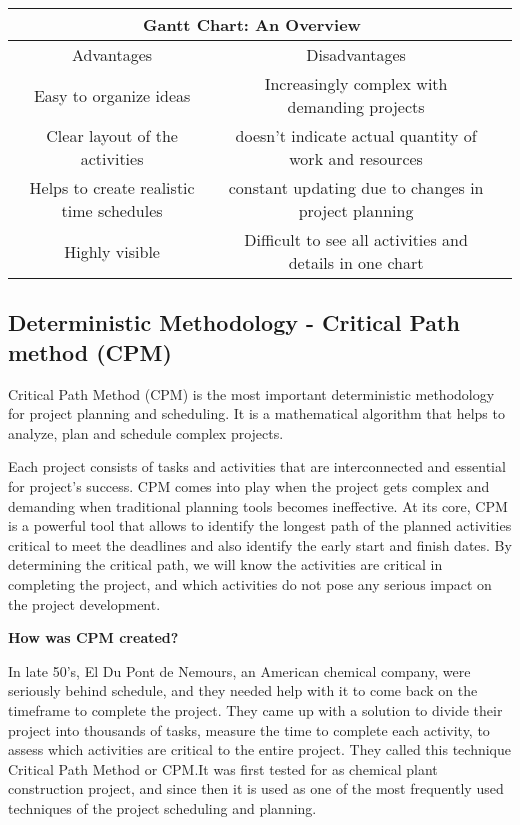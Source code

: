 \begin{tabular}{ |c|c|c| } 
	\hline
	\multicolumn{2}{|c|}{ Gantt Chart: An Overview} \\
	\hline
	Advantages & Disadvantages \\
	\hline
	Easy to organize ideas & Increasingly complex with demanding projects\\
	\hline
	Clear layout of the activities &  doesn't indicate actual quantity of work and resources \\
	\hline
	Helps to create realistic time schedules &constant updating due to changes in project planning \\
	\hline
	Highly visible  & Difficult to see all activities and details in one chart  \\
	\hline
\end{tabular}




\subsection{Deterministic Methodology - Critical Path method (CPM)}

Critical Path Method (CPM) is the most important deterministic methodology for project planning and scheduling. It is a mathematical algorithm that helps to analyze, plan and schedule complex projects.

Each project consists of tasks and activities that are interconnected and essential for project's success. CPM comes into play when the project gets complex and demanding when traditional planning tools becomes ineffective. At its core, CPM is a powerful tool that allows to identify the longest path of the planned activities critical to meet the deadlines and also identify the early start and finish dates. By determining the critical path, we will know the activities are critical in completing the project, and which activities do not pose any serious impact on the project development.

\textbf{How was CPM created? }

In late 50's, El Du Pont de Nemours, an American chemical company, were seriously behind schedule, and they needed help with it to come back on the timeframe to complete the project. They came up with a solution to divide their project into thousands of tasks, measure the time to complete each activity, to assess which activities are critical to the entire project. They called this technique Critical Path Method or CPM.It was first tested for as chemical plant construction project, and since then it is used as one of the most frequently used techniques of the project scheduling and planning. 


